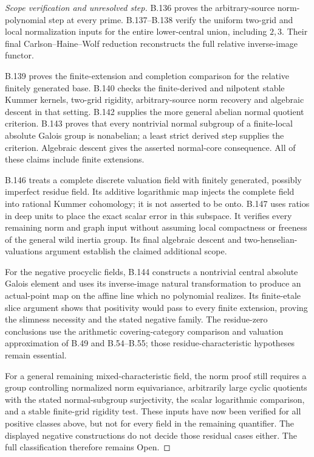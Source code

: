 \begin{proof}[Scope verification and unresolved step]
B.136 proves the arbitrary-source norm-polynomial step
at every prime. B.137--B.138 verify the uniform two-grid
and local normalization inputs for the entire
lower-central union, including $2,3$.
Their final Carlson--Haine--Wolf reduction reconstructs
the full relative inverse-image functor.

B.139 proves the finite-extension and completion
comparison for the relative finitely generated base.
B.140 checks the finite-derived and nilpotent stable
Kummer kernels, two-grid rigidity, arbitrary-source
norm recovery and algebraic descent in that setting.
B.142 supplies the more general abelian normal
quotient criterion. B.143 proves that every
nontrivial normal subgroup of a finite-local
absolute Galois group is nonabelian; a least strict
derived step supplies the criterion. Algebraic
descent gives the asserted normal-core consequence.
All of these claims include finite extensions.

B.146 treats a complete discrete valuation field
with finitely generated, possibly imperfect residue
field. Its additive logarithmic map injects the
complete field into rational Kummer cohomology;
it is not asserted to be onto.
B.147 uses ratios in deep units to place the exact
scalar error in this subspace. It verifies every
remaining norm and graph input without assuming
local compactness or freeness of the general wild
inertia group. Its final algebraic descent and
two-henselian-valuations argument establish the
claimed additional scope.

For the negative procyclic fields, B.144 constructs
a nontrivial central absolute Galois element and
uses its inverse-image natural transformation to
produce an actual-point map on the affine line
which no polynomial realizes. Its finite-etale
slice argument shows that positivity would pass
to every finite extension, proving the slimness
necessity and the stated negative family.
The residue-zero conclusions use the arithmetic
covering-category comparison and valuation
approximation of B.49 and B.54--B.55; those
residue-characteristic hypotheses remain essential.

For a general remaining mixed-characteristic field,
the norm proof still requires a group controlling
normalized norm equivariance, arbitrarily large
cyclic quotients with the stated normal-subgroup
surjectivity, the scalar logarithmic comparison,
and a stable finite-grid rigidity test.
These inputs have now been verified for all
positive classes above, but not for every field
in the remaining quantifier.
The displayed negative constructions do not
decide those residual cases either.
The full classification therefore remains Open.
\end{proof}
